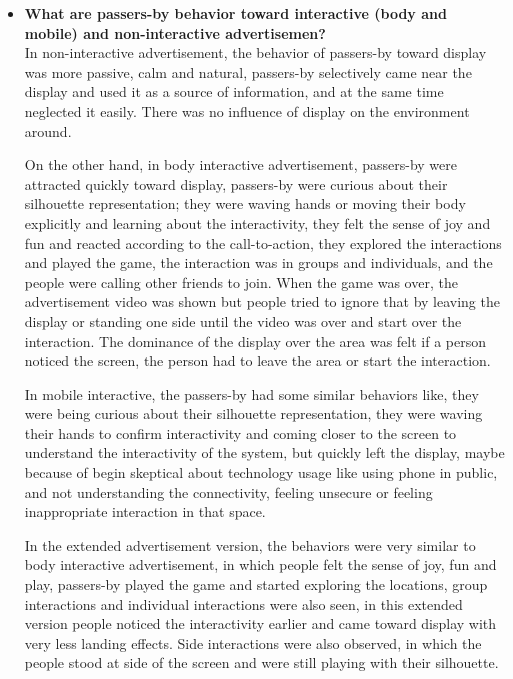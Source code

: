 \begin{itemize}

\item \textbf{What are passers-by behavior toward interactive (body and mobile) and non-interactive advertisemen?} \\
In non-interactive advertisement, the behavior of passers-by toward display was more passive, calm and natural, passers-by selectively came near the display and used it as a source of information, and at the same time neglected it easily. There was no influence of display on the environment around.

On the other hand, in body interactive advertisement, passers-by were attracted quickly toward display, passers-by were curious about their silhouette representation; they were waving hands or moving their body explicitly and learning about the interactivity, they felt the sense of joy and fun and reacted according to the call-to-action, they explored the interactions and played the game, the interaction was in groups and individuals, and the people were calling other friends to join. When the game was over, the advertisement video was shown but people tried to ignore that by leaving the display or standing one side until the video was over and start over the interaction. The dominance of the display over the area was felt if a person noticed the screen, the person had to leave the area or start the interaction. 

In mobile interactive, the passers-by had some similar behaviors like, they were being curious about their silhouette representation, they were waving their hands to confirm interactivity and coming closer to the screen to understand the interactivity of the system, but quickly left the display, maybe because of begin skeptical about technology usage like using phone in public, and not understanding the connectivity, feeling unsecure or feeling inappropriate interaction in that space.

In the extended advertisement version, the behaviors were very similar to body interactive advertisement, in which people felt the sense of joy, fun and play, passers-by played the game and started exploring the locations, group interactions and individual interactions were also seen, in this extended version people noticed the interactivity earlier and came toward display with very less landing effects. Side interactions were also observed, in which the people stood at side of the screen and were still playing with their silhouette.
 


\end{itemize}

